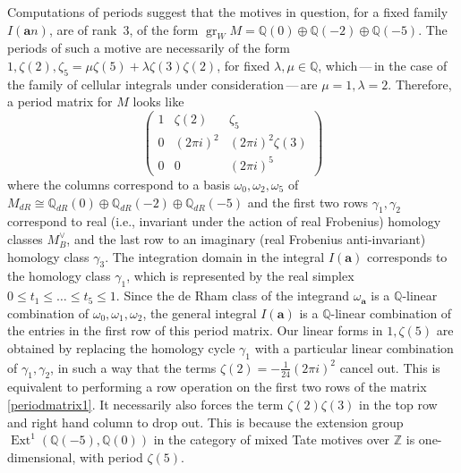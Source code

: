 \documentclass[12pt,reqno]{amsart}
\theoremstyle{remark}
\newcommand\ba{\boldsymbol a}
\begin{document}
Computations of periods suggest that the motives in question, for a fixed family
$I(\ba n)$, are of rank~$3$, of the form 
$\operatorname{gr}_W M = \mathbb{Q}(0) \oplus \mathbb{Q}(-2) \oplus \mathbb{Q}(-5)$.   The periods of such a motive are necessarily of the form $1, \zeta(2), \zeta_5=  \mu\zeta(5) + \lambda \zeta(3)\zeta(2)$, for  fixed $\lambda, \mu \in \mathbb{Q}$, which\,---\,in the case of the family of cellular integrals under consideration\,---\,are   $\mu=1, \lambda=2$.
Therefore, a period matrix for $M$ looks like
\begin{equation} \label{periodmatrix1}
\begin{pmatrix} 1 & \zeta(2) & \zeta_5  \\ 
0 & (2\pi i)^2 & (2\pi i)^2 \zeta(3)  \\
0 & 0 & (2\pi i)^5
\end{pmatrix}
\end{equation}
where the columns correspond to a basis  $\omega_0, \omega_2, \omega_5$ of $M_{dR}\cong\mathbb{Q}_{dR}(0) \oplus \mathbb{Q}_{dR}(-2)\oplus \mathbb{Q}_{dR}(-5)$ and the first two rows $\gamma_1, \gamma_2$ correspond to real (i.e., invariant under the action of real Frobenius) homology classes  $M_{B}^{\vee}$, and the last row to an imaginary (real Frobenius anti-invariant) homology class $\gamma_3$.  The integration domain in the integral $I(\ba)$ corresponds to the homology class $\gamma_1$, which is represented by the real simplex $0\leq t_1\leq \dots \leq t_5 \leq 1$. Since the  de Rham class of the integrand  $\omega_{\ba}$ is a $\mathbb{Q}$-linear combination of $\omega_0,\omega_1,\omega_2$, the general integral $I(\ba)$ is a $\mathbb{Q}$-linear combination of the entries in the first row of this period matrix. 
Our linear forms in $1, \zeta(5)$ are obtained by replacing the homology cycle $\gamma_1$ with a particular linear combination of $\gamma_1, \gamma_2$,  in such a way that the  terms  $\zeta(2) = -\frac{1}{24}  (2\pi i)^2 $ cancel out.  This is equivalent to performing a row operation on the first two rows of the matrix \eqref{periodmatrix1}. It necessarily also forces  the term
$\zeta(2)\zeta(3)$  in the top row and right hand column to drop out. This is because the extension group $\operatorname{Ext}^1(\mathbb{Q}(-5), \mathbb{Q}(0))$ in the category of mixed Tate motives over $\mathbb{Z}$ is one-dimensional, with period $\zeta(5)$. 
\end{document}
